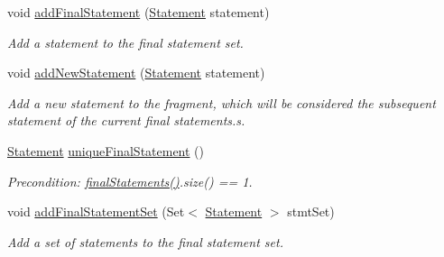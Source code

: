 \begin{DoxyCompactItemize}
\item 
void \hyperlink{classedu_1_1udel_1_1cis_1_1vsl_1_1civl_1_1model_1_1common_1_1CommonFragment_a1bda7e80a21c4aa40a4227b1652ef401}{add\+Final\+Statement} (\hyperlink{interfaceedu_1_1udel_1_1cis_1_1vsl_1_1civl_1_1model_1_1IF_1_1statement_1_1Statement}{Statement} statement)
\begin{DoxyCompactList}\small\item\em Add a statement to the final statement set. \end{DoxyCompactList}\item 
void \hyperlink{classedu_1_1udel_1_1cis_1_1vsl_1_1civl_1_1model_1_1common_1_1CommonFragment_ade9599c5c2230b64ad44f902869d0ee9}{add\+New\+Statement} (\hyperlink{interfaceedu_1_1udel_1_1cis_1_1vsl_1_1civl_1_1model_1_1IF_1_1statement_1_1Statement}{Statement} statement)
\begin{DoxyCompactList}\small\item\em Add a new statement to the fragment, which will be considered the subsequent statement of the current final statements.\+s. \end{DoxyCompactList}\item 
\hyperlink{interfaceedu_1_1udel_1_1cis_1_1vsl_1_1civl_1_1model_1_1IF_1_1statement_1_1Statement}{Statement} \hyperlink{classedu_1_1udel_1_1cis_1_1vsl_1_1civl_1_1model_1_1common_1_1CommonFragment_a363309eaa01e5650caeb246a399a706c}{unique\+Final\+Statement} ()
\begin{DoxyCompactList}\small\item\em Precondition\+: \hyperlink{classedu_1_1udel_1_1cis_1_1vsl_1_1civl_1_1model_1_1common_1_1CommonFragment_ab4e81c16318800dbdc9586d686879d8d}{final\+Statements()}.size() == 1. \end{DoxyCompactList}\item 
void \hyperlink{classedu_1_1udel_1_1cis_1_1vsl_1_1civl_1_1model_1_1common_1_1CommonFragment_a14cd7abf99bd1c9fe96668e2d517382e}{add\+Final\+Statement\+Set} (Set$<$ \hyperlink{interfaceedu_1_1udel_1_1cis_1_1vsl_1_1civl_1_1model_1_1IF_1_1statement_1_1Statement}{Statement} $>$ stmt\+Set)
\begin{DoxyCompactList}\small\item\em Add a set of statements to the final statement set. \end{DoxyCompactList}\end{DoxyCompactItemize}
